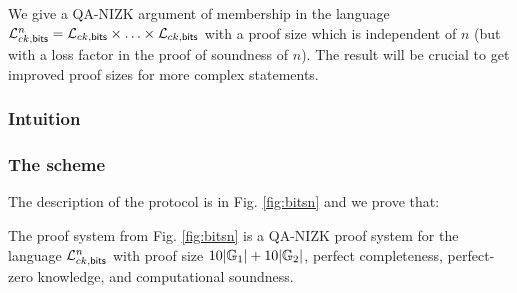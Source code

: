 We give a QA-NIZK argument of membership in the language $\mathcal{L}_{ck,\mathsf{bits}}^n  = \mathcal{L}_{ck,\mathsf{bits}} \times \ldots \times \mathcal{L}_{ck,\mathsf{bits}}$ with a proof size which is independent of $n$ (but with a loss factor in the proof of soundness of $n$). The result will be crucial to get improved proof sizes for more complex statements. 

\subsubsection{Intuition}


\subsubsection{The scheme}

The description of the protocol is in Fig. \ref{fig:bitsn} and  we prove that:

\begin{theorem} \label{theo:bitsnm} The proof system from Fig. \ref{fig:bitsn} is a QA-NIZK proof system for the language $\mathcal{L}_{ck,\mathsf{bits}}^n$ with proof size  
$10|\mathbb{G}_1|+10|\mathbb{G}_2|$, perfect completeness, perfect-zero knowledge, and computational soundness. 
\end{theorem}

